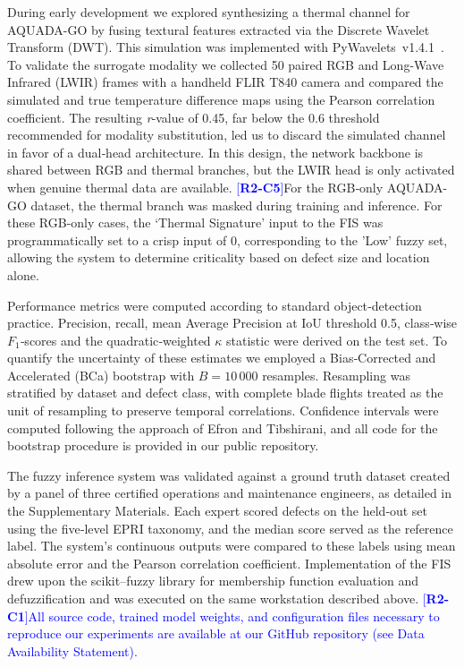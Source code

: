 \documentclass[energies,article,submit,pdftex,moreauthors]{Definitions/mdpi}
\newcommand{\revtag}[2]{[\textbf{R#1-C#2}]}
\newcommand{\Rtwo}[1]{\textcolor{blue}{#1}}
\begin{document}
During early development we explored synthesizing a thermal channel for AQUADA-GO by fusing textural features extracted via the Discrete Wavelet Transform (DWT). This simulation was implemented with PyWavelets~v1.4.1~\cite{lee2019pywavelets}. To validate the surrogate modality we collected 50 paired RGB and Long-Wave Infrared (LWIR) frames with a handheld FLIR T840 camera and compared the simulated and true temperature difference maps using the Pearson correlation coefficient. The resulting \textit{r}‑value of 0.45, far below the 0.6 threshold recommended for modality substitution, led us to discard the simulated channel in favor of a dual‑head architecture. In this design, the network backbone is shared between RGB and thermal branches, but the LWIR head is only activated when genuine thermal data are available. \Rtwo{\revtag{2}{5}}For the RGB‑only AQUADA-GO dataset, the thermal branch was masked during training and inference. For these RGB-only cases, the `Thermal Signature' input to the FIS was programmatically set to a crisp input of 0, corresponding to the 'Low' fuzzy set, allowing the system to determine criticality based on defect size and location alone.

Performance metrics were computed according to standard object‑detection practice. Precision, recall, mean Average Precision at IoU threshold 0.5, class‑wise \(F_{1}\)‑scores and the quadratic‑weighted \(\kappa\) statistic were derived on the test set. To quantify the uncertainty of these estimates we employed a Bias‑Corrected and Accelerated (BCa) bootstrap with \(B=10\,000\) resamples. Resampling was stratified by dataset and defect class, with complete blade flights treated as the unit of resampling to preserve temporal correlations. Confidence intervals were computed following the approach of Efron and Tibshirani, and all code for the bootstrap procedure is provided in our public repository.

The fuzzy inference system was validated against a ground truth dataset created by a panel of three certified operations and maintenance engineers, as detailed in the Supplementary Materials. Each expert scored defects on the held‑out set using the five‑level EPRI taxonomy, and the median score served as the reference label. The system’s continuous outputs were compared to these labels using mean absolute error and the Pearson correlation coefficient. Implementation of the FIS drew upon the scikit–fuzzy library for membership function evaluation and defuzzification and was executed on the same workstation described above. \Rtwo{\revtag{2}{1}All source code, trained model weights, and configuration files necessary to reproduce our experiments are available at our GitHub repository (see Data Availability Statement).}
\end{document}
